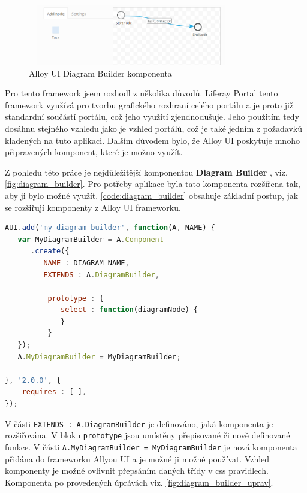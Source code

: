 \documentclass{fithesis}
\begin{document}
\begin{figure}[htp]
\centering
\includegraphics[width=340px, height=100px]{images/diagram_builder.png}
\caption{Alloy UI Diagram Builder komponenta}
\label{fig:diagram_builder}
\end{figure}

Pro tento framework jsem rozhodl z několika důvodů. Liferay Portal tento framework využívá pro tvorbu grafického rozhraní celého portálu a je proto již standardní součástí portálu, což jeho využití zjendnodušuje. Jeho použitím tedy dosáhnu stejného vzhledu jako je vzhled portálů, což je také jedním z požadavků kladených na tuto aplikaci. Dalším důvodem bylo, že Alloy UI poskytuje mnoho připravených komponent, které je možno využít. 

Z pohledu této práce je nejdůležitější komponentou \textbf{Diagram Builder} , viz. \autoref{fig:diagram_builder}. Pro potřeby aplikace byla tato komponenta rozšířena tak, aby ji bylo možné využít. \autoref{code:diagram_builder} obsahuje základní postup, jak se rozšiřují komponenty z Alloy UI frameworku.

\begin{lstlisting}[language=JavaScript, caption = Rozšíření komponenty Diagram Builder , label = code:diagram_builder]
AUI.add('my-diagram-builder', function(A, NAME) {
   var MyDiagramBuilder = A.Component
      .create({
         NAME : DIAGRAM_NAME,
         EXTENDS : A.DiagramBuilder,

          prototype : {
             select : function(diagramNode) {
             }
          }
   });
   A.MyDiagramBuilder = MyDiagramBuilder;

}, '2.0.0', {
	requires : [ ],
});

\end{lstlisting}

V části \verb|EXTENDS : A.DiagramBuilder| je definováno, jaká komponenta je rozšiřována. V bloku \verb|prototype| jsou umístěny přepisované či nově definované funkce. V části \verb|A.MyDiagramBuilder = MyDiagramBuilder| je nová komponenta přidána do frameworku Allyou UI a je možné ji možné používat. Vzhled komponenty je možné ovlivnit přepsáním daných třídy v css pravidlech. Komponenta po provedených úprávách viz. \autoref{fig:diagram_builder_uprav}.
\end{document}
